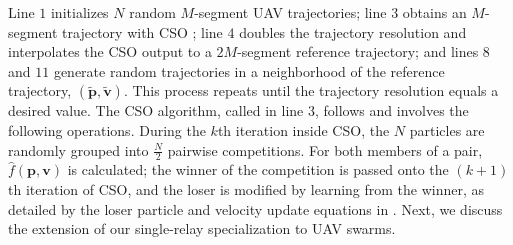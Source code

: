 \documentclass[10pt, twocolumn]{IEEEtran}
\theoremstyle{plain}
\theoremstyle{definition}
\theoremstyle{remark}
\newcommand{\nm}[1]{\textcolor{magenta}{[NM: #1]}}
\begin{document}
Line $1$ initializes $N$ random $M$-segment UAV trajectories; line $3$ obtains an $M$-segment trajectory with CSO \cite{CSO}; line $4$ doubles the trajectory resolution and interpolates the CSO output to a $2M$-segment reference trajectory; and lines $8$ and $11$ generate random trajectories in a neighborhood of the reference trajectory, $(\tilde{\mathbf p}, \tilde{\mathbf v})$. This process repeats until the trajectory resolution equals a desired value. The CSO algorithm, called in line $3$, follows \cite{CSO} and involves the following operations. During the $k$th iteration inside CSO, the $N$ particles are randomly grouped into $\frac{N}{2}$ pairwise competitions. For both members of a pair, $\hat{f}(\mathbf{p},\mathbf{v})$ is calculated; the winner of the competition is passed onto the $(k{+}1)$th iteration of CSO, and the loser is modified by learning from the winner, as detailed by the loser particle and velocity update equations in \cite{CSO}. Next, we discuss the extension of our single-relay specialization to UAV swarms.
\vspace{-2mm}


\end{document}
